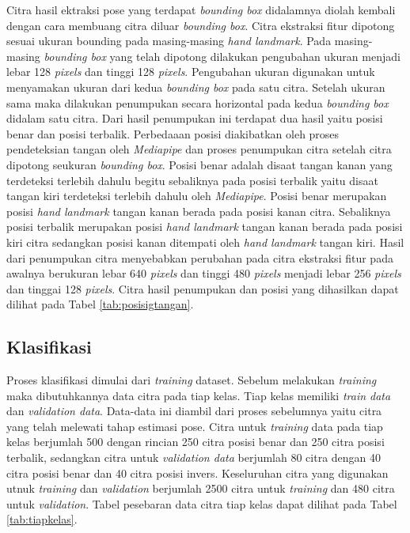 Citra hasil ektraksi pose yang terdapat \emph{bounding box} didalamnya diolah kembali dengan cara membuang citra diluar \emph{bounding box}. Citra ekstraksi fitur dipotong sesuai ukuran bounding pada masing-masing \emph{hand landmark}. Pada masing-masing \emph{bounding box} yang telah dipotong dilakukan pengubahan ukuran menjadi lebar 128 \emph{pixels} dan tinggi 128 \emph{pixels}. Pengubahan ukuran digunakan untuk menyamakan ukuran dari kedua \emph{bounding box} pada satu citra. Setelah ukuran sama maka dilakukan penumpukan secara horizontal pada kedua \emph{bounding box} didalam satu citra. Dari hasil penumpukan ini terdapat dua hasil yaitu posisi benar dan posisi terbalik. Perbedaaan posisi diakibatkan oleh proses pendeteksian tangan oleh \emph{Mediapipe} dan proses penumpukan citra setelah citra dipotong seukuran \emph{bounding box}. Posisi benar adalah disaat tangan kanan yang terdeteksi terlebih dahulu begitu sebaliknya pada posisi terbalik yaitu disaat tangan kiri terdeteksi terlebih dahulu oleh \emph{Mediapipe}. Posisi benar merupakan posisi \emph{hand landmark} tangan kanan berada pada posisi kanan citra. Sebaliknya posisi terbalik merupakan posisi \emph{hand landmark} tangan kanan berada pada posisi kiri citra sedangkan posisi kanan ditempati oleh \emph{hand landmark} tangan kiri. Hasil dari penumpukan citra menyebabkan perubahan pada citra ekstraksi fitur pada awalnya berukuran lebar 640 \emph{pixels} dan tinggi 480 \emph{pixels} menjadi lebar 256 \emph{pixels} dan tinggai 128 \emph{pixels}. Citra hasil penumpukan dan posisi yang dihasilkan dapat dilihat pada Tabel \ref{tab:posisigtangan}.





\subsection{Klasifikasi}
Proses klasifikasi dimulai dari \emph{training} dataset. Sebelum melakukan \emph{training} maka dibutuhkannya data citra pada tiap kelas. Tiap kelas memiliki \emph{train data} dan \emph{validation data}. Data-data ini diambil dari proses sebelumnya yaitu citra yang telah melewati tahap estimasi pose. Citra untuk \emph{training} data pada tiap kelas berjumlah 500 dengan rincian 250 citra posisi benar dan 250 citra posisi terbalik, sedangkan citra untuk \emph{validation data} berjumlah 80 citra dengan 40 citra posisi benar dan 40 citra posisi invers. Keseluruhan citra yang digunakan utnuk \emph{training} dan \emph{validation} berjumlah 2500 citra untuk \emph{training} dan 480 citra untuk \emph{validation}. Tabel pesebaran data citra tiap kelas dapat dilihat pada Tabel \ref{tab:tiapkelas}. 

